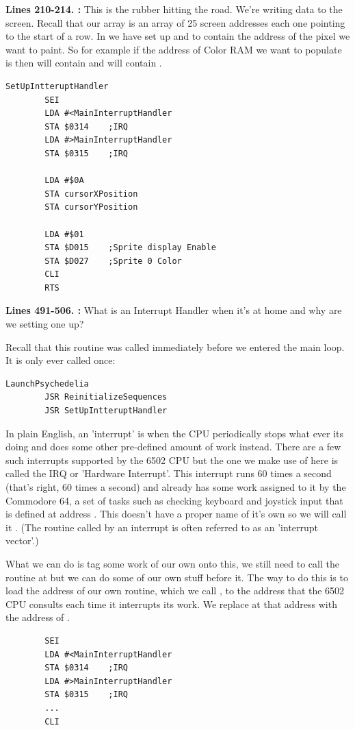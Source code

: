 \textbf{Lines 210-214. :} This is the rubber hitting the road. We're writing data to the
screen. Recall that our   array is an array of 25 screen addresses each one pointing
to the start of a row. In  we have set up  and  to contain the address of the pixel we want to paint. So for example if the address of Color RAM we want to populate
is  then  will contain  and  will
contain . 
\clearpage
\begin{lstlisting}
SetUpIntteruptHandler   
        SEI 
        LDA #<MainInterruptHandler
        STA $0314    ;IRQ
        LDA #>MainInterruptHandler
        STA $0315    ;IRQ

        LDA #$0A
        STA cursorXPosition
        STA cursorYPosition

        LDA #$01
        STA $D015    ;Sprite display Enable
        STA $D027    ;Sprite 0 Color
        CLI 
        RTS 
\end{lstlisting}
\clearpage
\textbf{Lines 491-506. :} What is an Interrupt Handler when it's at home and why are
we setting one up?

Recall that this routine was called immediately before we entered the main loop. It is only ever called once:
\begin{lstlisting}
LaunchPsychedelia   
        JSR ReinitializeSequences
        JSR SetUpIntteruptHandler
\end{lstlisting}

In plain English, an 'interrupt' is when the CPU periodically stops what ever its doing and does some other pre-defined amount
of work instead. There are a few such interrupts supported by the 6502 CPU but the one we make use of here is called the IRQ
or 'Hardware Interrupt'. This interrupt runs 60 times a second (that's right, 60 times a second) and already has some work
assigned to it by the Commodore 64, a set of tasks such as checking keyboard and joystick input that is defined at address .
This doesn't have a proper name of it's own so we will call it . (The routine called by an interrupt
is often referred to as an 'interrupt vector'.)

What we can do is tag some work of our own onto this, we still need to call the routine at  but we can do some of our
own stuff before it. The way to do this is to load the address of our own routine, which we call , to
the address that the 6502 CPU consults each time it interrupts its work. We replace  at that address with the address
of .  
\begin{lstlisting}
        SEI 
        LDA #<MainInterruptHandler
        STA $0314    ;IRQ
        LDA #>MainInterruptHandler
        STA $0315    ;IRQ
        ...
        CLI 
\end{lstlisting}

